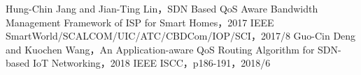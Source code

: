 \documentclass[a4paper,10pt,twocolumn,uplatex]{jsarticle}
\begin{document}
\footnotesize{
  \begin{thebibliography}{99}
     Hung-Chin Jang and Jian-Ting Lin，SDN Based QoS Aware Bandwidth Management Framework of ISP for Smart Homes，2017 IEEE SmartWorld/SCALCOM/UIC/ATC/CBDCom/IOP/SCI，2017/8
     Guo-Cin Deng and Kuochen Wang，An Application-aware QoS Routing Algorithm for SDN-based IoT Networking，2018 IEEE ISCC，p186-191，2018/6
  \end{thebibliography}
}

\end{document}
